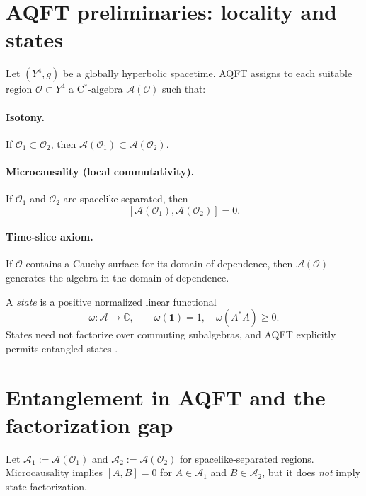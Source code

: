 \documentclass[11pt]{article}
\begin{document}
\section{AQFT preliminaries: locality and states}

Let $(Y^4,g)$ be a globally hyperbolic spacetime. AQFT assigns to each suitable region
$\mathcal{O}\subset Y^4$ a C$^\ast$-algebra $\mathcal{A}(\mathcal{O})$ such that:

\paragraph{Isotony.}
If $\mathcal{O}_1\subset\mathcal{O}_2$, then $\mathcal{A}(\mathcal{O}_1)\subset\mathcal{A}(\mathcal{O}_2)$.

\paragraph{Microcausality (local commutativity).}
If $\mathcal{O}_1$ and $\mathcal{O}_2$ are spacelike separated, then
\begin{equation}\label{eq:microcausality}
[\mathcal{A}(\mathcal{O}_1),\mathcal{A}(\mathcal{O}_2)]=0.
\end{equation}

\paragraph{Time-slice axiom.}
If $\mathcal{O}$ contains a Cauchy surface for its domain of dependence, then
$\mathcal{A}(\mathcal{O})$ generates the algebra in the domain of dependence.

A \emph{state} is a positive normalized linear functional
\[
\omega:\mathcal{A}\to\mathbb{C},\qquad \omega(\mathbf{1})=1,\quad \omega(A^\ast A)\ge 0.
\]
States need not factorize over commuting subalgebras, and AQFT explicitly permits entangled states
\cite{Haag1996,BFV2003}.

\section{Entanglement in AQFT and the factorization gap}

Let $\mathcal{A}_1:=\mathcal{A}(\mathcal{O}_1)$ and $\mathcal{A}_2:=\mathcal{A}(\mathcal{O}_2)$ for spacelike-separated regions.
Microcausality implies $[A,B]=0$ for $A\in\mathcal{A}_1$ and $B\in\mathcal{A}_2$, but it does \emph{not} imply state factorization.
\end{document}
